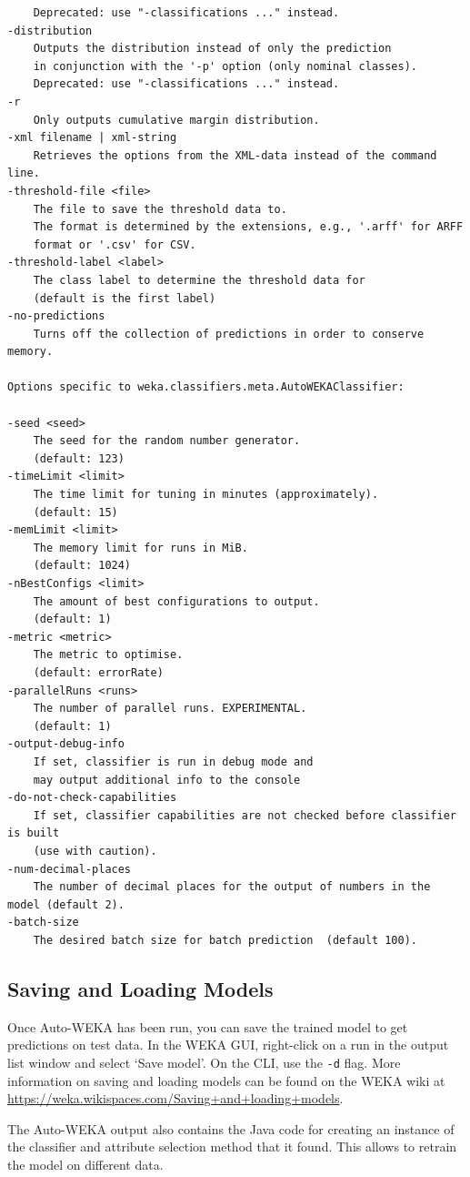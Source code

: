 \documentclass{article}
\begin{document}
\begin{verbatim}
	Deprecated: use "-classifications ..." instead.
-distribution
	Outputs the distribution instead of only the prediction
	in conjunction with the '-p' option (only nominal classes).
	Deprecated: use "-classifications ..." instead.
-r
	Only outputs cumulative margin distribution.
-xml filename | xml-string
	Retrieves the options from the XML-data instead of the command line.
-threshold-file <file>
	The file to save the threshold data to.
	The format is determined by the extensions, e.g., '.arff' for ARFF
	format or '.csv' for CSV.
-threshold-label <label>
	The class label to determine the threshold data for
	(default is the first label)
-no-predictions
	Turns off the collection of predictions in order to conserve memory.

Options specific to weka.classifiers.meta.AutoWEKAClassifier:

-seed <seed>
	The seed for the random number generator.
	(default: 123)
-timeLimit <limit>
	The time limit for tuning in minutes (approximately).
	(default: 15)
-memLimit <limit>
	The memory limit for runs in MiB.
	(default: 1024)
-nBestConfigs <limit>
	The amount of best configurations to output.
	(default: 1)
-metric <metric>
	The metric to optimise.
	(default: errorRate)
-parallelRuns <runs>
	The number of parallel runs. EXPERIMENTAL.
	(default: 1)
-output-debug-info
	If set, classifier is run in debug mode and
	may output additional info to the console
-do-not-check-capabilities
	If set, classifier capabilities are not checked before classifier is built
	(use with caution).
-num-decimal-places
	The number of decimal places for the output of numbers in the model (default 2).
-batch-size
	The desired batch size for batch prediction  (default 100).
\end{verbatim}

\subsection{Saving and Loading Models}

Once Auto-WEKA has been run, you can save the trained model to get predictions
on test data. In the WEKA GUI, right-click on a run in the output list window
and select `Save model'. On the CLI, use the \verb=-d= flag. More information on
saving and loading models can be found on the WEKA wiki at
\url{https://weka.wikispaces.com/Saving+and+loading+models}.

The Auto-WEKA output also contains the Java code for creating an instance of the
classifier and attribute selection method that it found. This allows to retrain
the model on different data.
\end{document}
